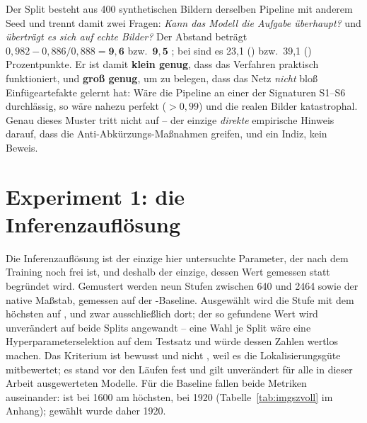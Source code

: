 \label{sec:simtoreal}
Der Split  besteht aus 400 synthetischen Bildern derselben Pipeline
mit anderem Seed und trennt damit zwei Fragen: \emph{Kann das Modell die Aufgabe
überhaupt?} und \emph{überträgt es sich auf echte Bilder?} Der Abstand beträgt
$0{,}982 - 0{,}886/0{,}888 = \mathbf{9{,}6}$ bzw.\ $\mathbf{9{,}5}$\PP{}
\mAPfifty{}; bei \mAPall{} sind es 23,1 () bzw.\ 39,1 ()
Prozentpunkte. Er ist damit \textbf{klein genug}, dass das Verfahren praktisch
funktioniert, und \textbf{groß genug}, um zu belegen, dass das Netz \emph{nicht}
bloß Einfügeartefakte gelernt hat: Wäre die Pipeline an einer der Signaturen
S1--S6 durchlässig, so wäre  nahezu perfekt ($>0{,}99$) und die realen
Bilder katastrophal. Genau dieses Muster tritt nicht auf -- der einzige
\emph{direkte} empirische Hinweis darauf, dass die Anti-Abkürzungs-Maßnahmen
greifen, und ein Indiz, kein Beweis.

\section{Experiment 1: die Inferenzauflösung}
\label{sec:imgsz}

Die Inferenzauflösung ist der einzige hier untersuchte Parameter, der nach dem
Training noch frei ist, und deshalb der einzige, dessen Wert gemessen statt
begründet wird. Gemustert werden neun Stufen zwischen 640 und 2464\px{} sowie
der native Maßstab, gemessen auf der -Baseline. Ausgewählt wird
die Stufe mit dem höchsten \mAPall{} auf , und zwar ausschließlich
dort; der so gefundene Wert wird unverändert auf beide Splits angewandt -- eine
Wahl je Split wäre eine Hyperparameterselektion auf dem Testsatz und würde
dessen Zahlen wertlos machen. Das Kriterium ist bewusst \mAPall{} und nicht
\mAPfifty{}, weil es die Lokalisierungsgüte mitbewertet; es stand vor den Läufen
fest und gilt unverändert für alle in dieser Arbeit ausgewerteten Modelle. Für
die Baseline fallen beide Metriken auseinander: \mAPfifty{} ist bei 1600 am
höchsten, \mAPall{} bei 1920 (Tabelle~\ref{tab:imgszvoll} im Anhang); gewählt
wurde daher 1920.

